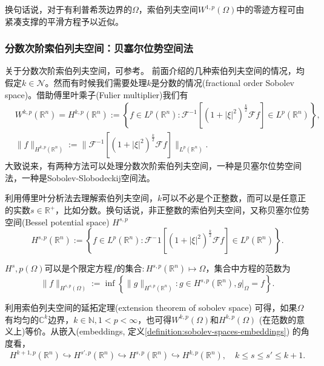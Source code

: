 换句话说，对于有利普希茨边界的$\Omega$，索伯列夫空间$W^{1,p}(\Omega)$中的零迹方程可由紧凑支撑的平滑方程予以近似。

\subsubsection{分数次阶索伯列夫空间：贝塞尔位势空间法}
关于分数次阶索伯列夫空间，可参考\cite{DiNezza:2012wk}。
前面介绍的几种索伯列夫空间的情况，均假定$k \in \mathcal{N}$。然而有时候我们需要处理$k$是分数的情况(fractional order Sobolev space)。借助傅里叶乘子(Fulier multiplier)我们有
\begin{equation*}
  \begin{split}
    &W^{k,p}(\mathbb{R}^n) = H^{k,p}(\mathbb{R}^n) :=
    \left\{
    f \in L^p(\mathbb{R}^n): \mathcal{F}^{-1}
    \left[
    \left( 1 + \left| \xi \right|^2 \right)^{\frac{k}{2}} \mathcal{F} f
    \right] \in L^p(\mathbb{R}^n)
    \right\},\\
    & \Big\| f \Big\|_{H^{k,p} \left( \mathbb{R}^n \right)} := \Big\| \mathcal{F}^{-1} \left[
     \left( 1 + \left| \xi \right|^2 \right)^{\frac{k}{2}}
    \mathcal{F} f \right] \Big\|_{L^p(\mathbb{R}^n)}.
  \end{split}
\end{equation*}
大致说来，有两种方法可以处理分数次阶索伯列夫空间，一种是贝塞尔位势空间法，一种是Sobolev-Slobodeckij空间法。
\begin{definition}[贝塞尔位势空间]
利用傅里叶分析法去理解索伯列夫空间，$k$可以不必是个正整数，而可以是任意正的实数$s \in \mathbb{R}^{+}$，比如分数。换句话说，非正整数的索伯列夫空间，又称贝塞尔位势空间(Bessel potential space) $H^{s,p}$
\begin{equation*}
  H^{s,p}(\mathbb{R}^n) := \left\{
  f \in L^p(\mathbb{R}^n): \mathcal{F}^-1 \left[
  \left( 1 + \left| \xi \right|^2 \right)^{\frac{k}{2}}
 \mathcal{F} f \right] \in L^p(\mathbb{R}^n)
  \right\}.
\end{equation*}

$H^s,p(\Omega)$可以是个限定方程$f$的集合$:H^{s,p}(\mathbb{R}^n) \mapsto \Omega$，集合中方程的范数为
\begin{equation*}
  \Big\| f \Big\|_{H^{s,p}(\Omega)} := \inf \left\{
  \Big\| g \Big\|_{H^{s,p}(\mathbb{R}^n)}: g \in H^{s,p}(\mathbb{R}^n), g \big|_{\Omega} = f
  \right\}.
\end{equation*}
\end{definition}

利用索伯列夫空间的延拓定理(extension theorem of sobolev space) 可得，如果$\Omega$有均匀的$\mathbb{C}^k$边界，$k \in \mathbb{N}, 1 < p < \infty$，也可得$W^{k,p}(\Omega)$和$H^{k,p}(\Omega)$ (在范数的意义上)等价。从嵌入(embeddings, 定义\ref{definition:sobolev-spaces-embeddings}) 的角度看，
\begin{equation*}
  H^{k+1,p}(\mathbb{R}^n) \hookrightarrow H^{s',p}(\mathbb{R}^n) \hookrightarrow H^{s,p}(\mathbb{R}^n) \hookrightarrow H^{k,p}(\mathbb{R}^n), \quad k \le s \le s' \le k+1.
\end{equation*}

